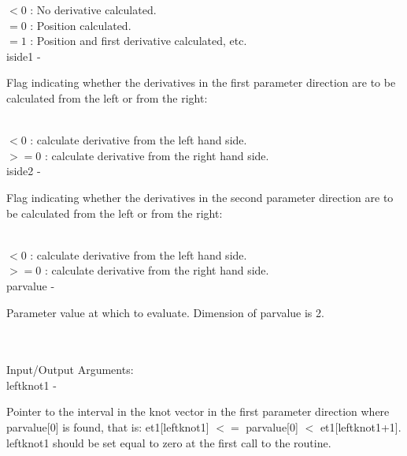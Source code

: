                 \>\>\>\>  $< 0$ : \> No derivative calculated.\\
                \>\>\>\>  $= 0$ : \> Position calculated.\\
                \>\>\>\>  $= 1$ : \> Position and first derivative calculated, etc.\\
        \>\>    {\fov iside1}\> - \>  \begin{minipg2}
                     Flag indicating whether the derivatives in the first
                     parameter direction are to be calculated from the
                     left or from the right:
                               \end{minipg2}\\[0.8ex]
         \>\>\>\>  $< 0$  : \> calculate derivative from the left hand side.\\
         \>\>\>\>  $>= 0$ : \> calculate derivative from the right hand side.\\
        \>\>    {\fov iside2}\> - \>  \begin{minipg2}
                     Flag indicating whether the derivatives in the second
                     parameter direction are to be calculated from the
                     left or from the right:
                               \end{minipg2}\\[0.8ex]
         \>\>\>\>  $< 0$  : \> calculate derivative from the left hand side.\\
         \>\>\>\>  $>= 0$ : \> calculate derivative from the right hand side.\\
        \>\>    {\fov parvalue}\> - \>  \begin{minipg2}
                     Parameter value at which to evaluate. Dimension of
                     parvalue is 2.
                               \end{minipg2}\\[0.8ex]
\\
	\>Input/Output Arguments:\\
        \>\>    {\fov leftknot1}\> - \>  \begin{minipg2}
                     Pointer to the interval in the knot vector in the
                     first parameter direction where parvalue[0] is found,
                     that is:
                          et1[leftknot1] $<=$ parvalue[0] $<$ et1[leftknot1+1].
                     leftknot1 should be set equal to zero at the first call
                     to the routine.
                               \end{minipg2}\\[0.8ex]
